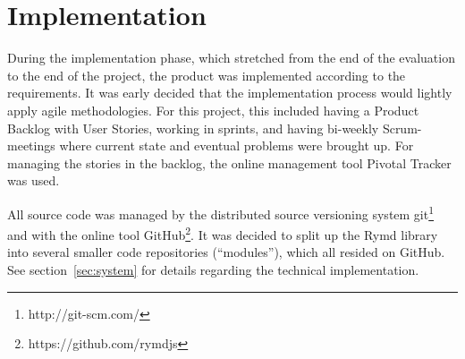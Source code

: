 \section{Implementation}

During the implementation phase, which stretched from the end of the evaluation to the end of the project, the product was implemented according to the requirements. It was early decided that the implementation process would lightly apply agile methodologies. For this project, this included having a Product Backlog with User Stories, working in sprints, and having bi-weekly Scrum-meetings where current state and eventual problems were brought up. For managing the stories in the backlog, the online management tool Pivotal Tracker was used.

All source code was managed by the distributed source versioning system git\footnote{http://git-scm.com/} and with the online tool GitHub\footnote{https://github.com/rymdjs}. It was decided to split up the Rymd library into several smaller code repositories (“modules”), which all resided on GitHub. See section~\ref{sec:system} for details regarding the technical implementation.
